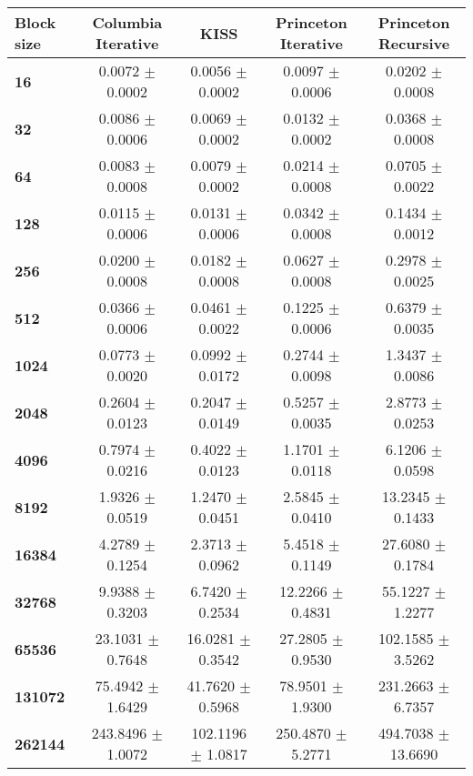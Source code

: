 \begin{tabular}{lcccc}\toprule
\textbf{Block size}  & \textbf{Columbia Iterative} & \textbf{KISS} & \textbf{Princeton Iterative} & \textbf{Princeton Recursive}\\\midrule
\textbf{16}  & 0.0072 $\pm$ 0.0002 & 0.0056 $\pm$ 0.0002 & 0.0097 $\pm$ 0.0006 & 0.0202 $\pm$ 0.0008\\
\textbf{32}  & 0.0086 $\pm$ 0.0006 & 0.0069 $\pm$ 0.0002 & 0.0132 $\pm$ 0.0002 & 0.0368 $\pm$ 0.0008\\
\textbf{64}  & 0.0083 $\pm$ 0.0008 & 0.0079 $\pm$ 0.0002 & 0.0214 $\pm$ 0.0008 & 0.0705 $\pm$ 0.0022\\
\textbf{128}  & 0.0115 $\pm$ 0.0006 & 0.0131 $\pm$ 0.0006 & 0.0342 $\pm$ 0.0008 & 0.1434 $\pm$ 0.0012\\
\textbf{256}  & 0.0200 $\pm$ 0.0008 & 0.0182 $\pm$ 0.0008 & 0.0627 $\pm$ 0.0008 & 0.2978 $\pm$ 0.0025\\
\textbf{512}  & 0.0366 $\pm$ 0.0006 & 0.0461 $\pm$ 0.0022 & 0.1225 $\pm$ 0.0006 & 0.6379 $\pm$ 0.0035\\
\textbf{1024}  & 0.0773 $\pm$ 0.0020 & 0.0992 $\pm$ 0.0172 & 0.2744 $\pm$ 0.0098 & 1.3437 $\pm$ 0.0086\\
\textbf{2048}  & 0.2604 $\pm$ 0.0123 & 0.2047 $\pm$ 0.0149 & 0.5257 $\pm$ 0.0035 & 2.8773 $\pm$ 0.0253\\
\textbf{4096}  & 0.7974 $\pm$ 0.0216 & 0.4022 $\pm$ 0.0123 & 1.1701 $\pm$ 0.0118 & 6.1206 $\pm$ 0.0598\\
\textbf{8192}  & 1.9326 $\pm$ 0.0519 & 1.2470 $\pm$ 0.0451 & 2.5845 $\pm$ 0.0410 & 13.2345 $\pm$ 0.1433\\
\textbf{16384}  & 4.2789 $\pm$ 0.1254 & 2.3713 $\pm$ 0.0962 & 5.4518 $\pm$ 0.1149 & 27.6080 $\pm$ 0.1784\\
\textbf{32768}  & 9.9388 $\pm$ 0.3203 & 6.7420 $\pm$ 0.2534 & 12.2266 $\pm$ 0.4831 & 55.1227 $\pm$ 1.2277\\
\textbf{65536}  & 23.1031 $\pm$ 0.7648 & 16.0281 $\pm$ 0.3542 & 27.2805 $\pm$ 0.9530 & 102.1585 $\pm$ 3.5262\\
\textbf{131072}  & 75.4942 $\pm$ 1.6429 & 41.7620 $\pm$ 0.5968 & 78.9501 $\pm$ 1.9300 & 231.2663 $\pm$ 6.7357\\
\textbf{262144} & 243.8496 $\pm$ 1.0072 & 102.1196 $\pm$ 1.0817 & 250.4870 $\pm$ 5.2771 & 494.7038 $\pm$ 13.6690\\
\bottomrule
\end{tabular}
